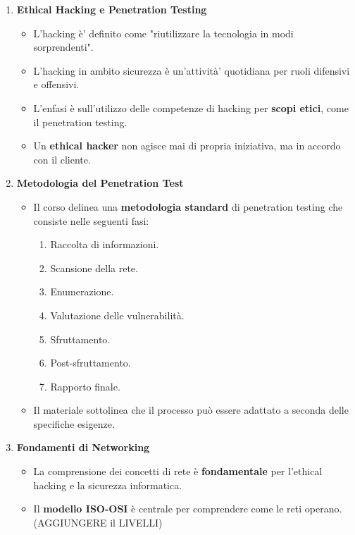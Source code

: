 \documentclass[12pt]{article}
\begin{document}
\begin{enumerate}
    \item \textbf{Ethical Hacking e Penetration Testing}
    \begin{itemize}
        \item L'hacking \`{e}' definito come "riutilizzare la tecnologia in modi 
        sorprendenti".
        \item L'hacking in ambito sicurezza \`{e} un'attivit\`{a}' quotidiana 
        per ruoli difensivi e offensivi.
        \item L'enfasi \`{e} sull'utilizzo delle competenze di hacking per 
        \textbf{scopi etici}, come il penetration testing.
        \item Un \textbf{ethical hacker} non agisce mai di propria iniziativa, 
        ma in accordo con il cliente.
    \end{itemize}
    \item \textbf{Metodologia del Penetration Test}
    \begin{itemize}
        \item Il corso delinea una \textbf{metodologia standard} di penetration 
        testing che consiste nelle seguenti fasi:
        \begin{enumerate}
            \item Raccolta di informazioni.
            \item Scansione della rete.
            \item Enumerazione.
            \item Valutazione delle vulnerabilità.
            \item Sfruttamento.
            \item Post-sfruttamento.
            \item Rapporto finale.
        \end{enumerate}
        \item Il materiale sottolinea che il processo pu\`{o} essere adattato a 
        seconda delle specifiche esigenze.
    \end{itemize}
    \item \textbf{Fondamenti di Networking}
    \begin{itemize}
        \item La comprensione dei concetti di rete \`{e} \textbf{fondamentale} 
        per l'ethical hacking e la sicurezza informatica.
        \item Il \textbf{modello ISO-OSI} \`{e} centrale per comprendere come 
        le reti operano. (AGGIUNGERE il LIVELLI) 

\end{itemize}
\end{enumerate}
\end{document}
